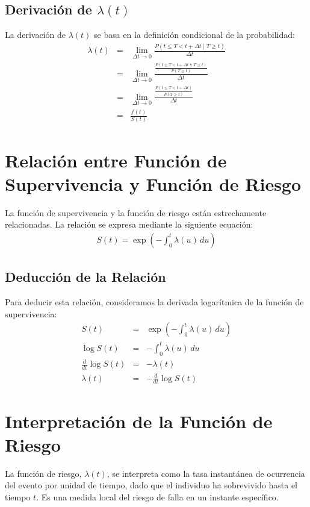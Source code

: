 \documentclass[a4paper]{report} %
\begin{document}
\subsection{Derivaci\'on de $\lambda(t)$}
La derivaci\'on de $\lambda(t)$ se basa en la definici\'on condicional de la probabilidad:
\begin{eqnarray*}
\lambda(t) &=& \lim_{\Delta t \to 0} \frac{P(t \leq T < t + \Delta t \mid T \geq t)}{\Delta t} \\
           &=& \lim_{\Delta t \to 0} \frac{\frac{P(t \leq T < t + \Delta t \text{ y } T \geq t)}{P(T \geq t)}}{\Delta t} \\
           &=& \lim_{\Delta t \to 0} \frac{\frac{P(t \leq T < t + \Delta t)}{P(T \geq t)}}{\Delta t} \\
           &=& \frac{f(t)}{S(t)}
\end{eqnarray*}

\section{Relaci\'on entre Funci\'on de Supervivencia y Funci\'on de Riesgo}
La funci\'on de supervivencia y la funci\'on de riesgo est\'an estrechamente relacionadas. La relaci\'on se expresa mediante la siguiente ecuaci\'on:
\begin{eqnarray*}
S(t) = \exp\left(-\int_0^t \lambda(u) \, du\right)
\end{eqnarray*}

\subsection{Deducci\'on de la Relaci\'on}
Para deducir esta relaci\'on, consideramos la derivada logar\'itmica de la funci\'on de supervivencia:
\begin{eqnarray*}
S(t) &=& \exp\left(-\int_0^t \lambda(u) \, du\right) \\
\log S(t) &=& -\int_0^t \lambda(u) \, du \\
\frac{d}{dt} \log S(t) &=& -\lambda(t) \\
\lambda(t) &=& -\frac{d}{dt} \log S(t)
\end{eqnarray*}

\section{Interpretaci\'on de la Funci\'on de Riesgo}
La funci\'on de riesgo, $\lambda(t)$, se interpreta como la tasa instant\'anea de ocurrencia del evento por unidad de tiempo, dado que el individuo ha sobrevivido hasta el tiempo $t$. Es una medida local del riesgo de falla en un instante espec\'ifico.
\end{document}
